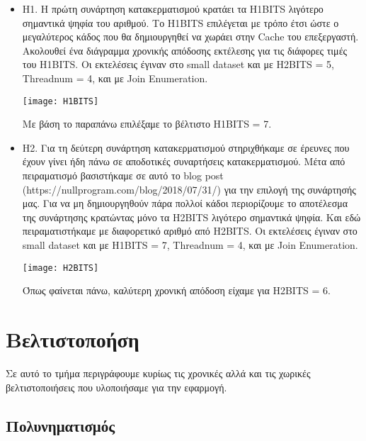 \documentclass[12pt, a4paper]{article}
\begin{document}
\begin{itemize}
\item H1. Η πρώτη συνάρτηση κατακερματισμού κρατάει τα H1BITS λιγότερο σημαντικά ψηφία του αριθμού. Το H1BITS επιλέγεται με τρόπο έτσι ώστε ο μεγαλύτερος κάδος που θα δημιουργηθεί να χωράει στην Cache του επεξεργαστή. Ακολουθεί ένα διάγραμμα χρονικής απόδοσης εκτέλεσης για τις διάφορες τιμές του H1BITS. Οι εκτελέσεις έγιναν στο small dataset και με H2BITS = 5, Threadnum = 4, και με Join Enumeration.

\begin{center}
\texttt{[image: H1BITS]}
\end{center}


Με βάση το παραπάνω επιλέξαμε το βέλτιστο H1BITS = 7.

\item H2. Για τη δεύτερη συνάρτηση κατακερματισμού στηριχθήκαμε σε έρευνες που έχουν γίνει ήδη πάνω σε αποδοτικές συναρτήσεις κατακερματισμού. Μέτα από πειραματισμό βασιστήκαμε σε αυτό το blog post (https://nullprogram.com/blog/2018/07/31/) για την επιλογή της συνάρτησής μας. Για να μη δημιουργηθούν πάρα πολλοί κάδοι περιορίζουμε το αποτέλεσμα της συνάρτησης κρατώντας μόνο τα H2BITS λιγότερο σημαντικά ψηφία. Και εδώ πειραματιστήκαμε με διαφορετικό αριθμό από H2BITS. Οι εκτελέσεις έγιναν στο small dataset και με H1BITS = 7, Threadnum = 4, και με Join Enumeration.

\begin{center}
\texttt{[image: H2BITS]}
\end{center}

Όπως φαίνεται πάνω, καλύτερη χρονική απόδοση είχαμε για H2BITS = 6.\\

\end{itemize}

\section{Βελτιστοποήση}

Σε αυτό το τμήμα περιγράφουμε κυρίως τις χρονικές αλλά και τις χωρικές βελτιστοποιήσεις που υλοποιήσαμε για την εφαρμογή.

\subsection{Πολυνηματισμός}
\end{document}
